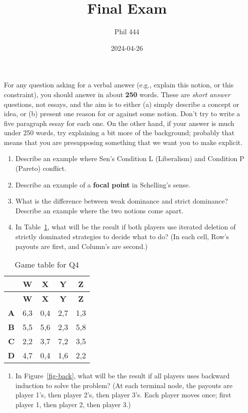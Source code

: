 \documentclass[
  12pt,
  letterpaper,
  DIV=11,
  numbers=noendperiod]{scrartcl}
\title{Final Exam}
\author{Phil 444}
\date{2024-04-26}
\providecommand{\tightlist}{%
  \setlength{\itemsep}{0pt}\setlength{\parskip}{0pt}}\usepackage{longtable,booktabs,array}
\renewcommand\maketitle{
  \fancyhead[C]{
    \thetitle
    \ifx \theauthor\empty  \else \ – \theauthor \fi
    \ifx \thedate\empty  \else \ – \thedate \ \fi
  }
}
\begin{document}
\maketitle

For any question asking for a verbal answer (e.g., explain this notion,
or this constraint), you should answer in about \textbf{250} words.
These are \emph{short answer} questions, not essays, and the aim is to
either (a) simply describe a concept or idea, or (b) present one reason
for or against some notion. Don't try to write a five paragraph essay
for each one. On the other hand, if your answer is much under 250 words,
try explaining a bit more of the background; probably that means that
you are presupposing something that we want you to make explicit.

\begin{enumerate}
\def\labelenumi{\arabic{enumi}.}
\tightlist
\item
  Describe an example where Sen's Condition L (Liberalism) and Condition
  P (Pareto) conflict.
\item
  Describe an example of a \textbf{focal point} in Schelling's sense.
\item
  What is the difference between weak dominance and strict dominance?
  Describe an example where the two notions come apart.
\item
  In Table~\ref{tbl-dom}, what will be the result if both players use
  iterated deletion of strictly dominated strategies to decide what to
  do? (In each cell, Row's payouts are first, and Column's are second.)
\end{enumerate}

\begin{longtable}[]{@{}ccccc@{}}
\caption{Game table for Q4}\label{tbl-dom}\tabularnewline
\toprule\noalign{}
& \textbf{W} & \textbf{X} & \textbf{Y} & \textbf{Z} \\
\midrule\noalign{}
\endfirsthead
\toprule\noalign{}
& \textbf{W} & \textbf{X} & \textbf{Y} & \textbf{Z} \\
\midrule\noalign{}
\endhead
\bottomrule\noalign{}
\endlastfoot
\textbf{A} & 6,3 & 0,4 & 2,7 & 1,3 \\
\textbf{B} & 5,5 & 5,6 & 2,3 & 5,8 \\
\textbf{C} & 2,2 & 3,7 & 7,2 & 3,5 \\
\textbf{D} & 4,7 & 0,4 & 1,6 & 2,2 \\
\end{longtable}

\begin{enumerate}
\def\labelenumi{\arabic{enumi}.}
\setcounter{enumi}{4}
\tightlist
\item
  In Figure~\ref{fig-back}, what will be the result if all players uses
  backward induction to solve the problem? (At each terminal node, the
  payouts are player 1's, then player 2's, then player 3's. Each player
  moves once; first player 1, then player 2, then player 3.)
\end{enumerate}
\end{document}

